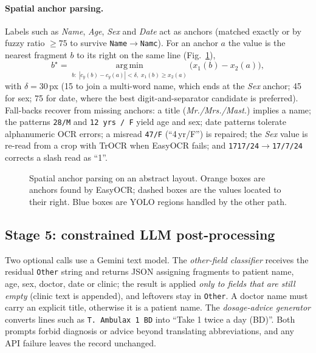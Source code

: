 \documentclass[journal]{IEEEtran}
\begin{document}
\paragraph{Spatial anchor parsing.} Labels such as \emph{Name}, \emph{Age}, \emph{Sex} and \emph{Date} act as anchors (matched exactly or by fuzzy ratio $\ge75$ to survive \texttt{Name}$\to$\texttt{Namc}). For an anchor $a$ the value is the nearest fragment $b$ to its right on the same line (Fig.~\ref{fig:spatial}),
\begin{equation}
b^\star=\operatorname*{arg\,min}_{b:\;|c_y(b)-c_y(a)|<\delta,\;x_1(b)\ge x_2(a)}\bigl(x_1(b)-x_2(a)\bigr),
\end{equation}
with $\delta=30$\,px (15 to join a multi-word name, which ends at the \emph{Sex} anchor; 45 for sex; 75 for date, where the best digit-and-separator candidate is preferred). Fall-backs recover from missing anchors: a title (\emph{Mr./Mrs./Mast.}) implies a name; the patterns \texttt{28/M} and \texttt{12\,yrs\,/\,F} yield age and sex; date patterns tolerate alphanumeric OCR errors; a misread \texttt{47/F} (``4\,yr/F'') is repaired; the \emph{Sex} value is re-read from a crop with TrOCR when EasyOCR fails; and \texttt{1717/24}$\to$\texttt{17/7/24} corrects a slash read as ``1''.

\begin{figure}[t]
\centering
\resizebox{0.9\textwidth}{!}{}
\caption{Spatial anchor parsing on an abstract layout. Orange boxes are anchors found by EasyOCR; dashed boxes are the values located to their right. Blue boxes are YOLO regions handled by the other path.}
\label{fig:spatial}
\end{figure}

\subsection{Stage 5: constrained LLM post-processing}\label{sec:llm}
Two optional calls use a Gemini text model. The \emph{other-field classifier} receives the residual \texttt{Other} string and returns JSON assigning fragments to patient name, age, sex, doctor, date or clinic; the result is applied \emph{only to fields that are still empty} (clinic text is appended), and leftovers stay in \texttt{Other}. A doctor name must carry an explicit title, otherwise it is a patient name. The \emph{dosage-advice generator} converts lines such as \texttt{T. Ambulax 1 BD} into ``Take 1 twice a day (BD)''. Both prompts forbid diagnosis or advice beyond translating abbreviations, and any API failure leaves the record unchanged.
\end{document}
